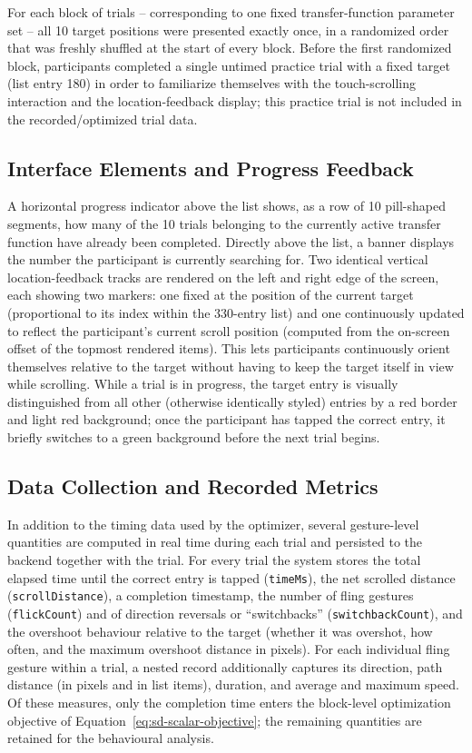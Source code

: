 For each block of trials -- corresponding to one fixed transfer-function parameter set -- all 10 target positions were presented exactly once, in a randomized order that was freshly shuffled at the start of every block. Before the first randomized block, participants completed a single untimed practice trial with a fixed target (list entry 180) in order to familiarize themselves with the touch-scrolling interaction and the location-feedback display; this practice trial is not included in the recorded/optimized trial data.

\subsection{Interface Elements and Progress Feedback}
\label{sec:interface}

A horizontal progress indicator above the list shows, as a row of 10 pill-shaped segments, how many of the 10 trials belonging to the currently active transfer function have already been completed. Directly above the list, a banner displays the number the participant is currently searching for. Two identical vertical location-feedback tracks are rendered on the left and right edge of the screen, each showing two markers: one fixed at the position of the current target (proportional to its index within the 330-entry list) and one continuously updated to reflect the participant's current scroll position (computed from the on-screen offset of the topmost rendered items). This lets participants continuously orient themselves relative to the target without having to keep the target itself in view while scrolling. While a trial is in progress, the target entry is visually distinguished from all other (otherwise identically styled) entries by a red border and light red background; once the participant has tapped the correct entry, it briefly switches to a green background before the next trial begins.

\subsection{Data Collection and Recorded Metrics}
\label{sec:data-collection}

In addition to the timing data used by the optimizer, several gesture-level quantities are computed in real time during each trial and persisted to the backend together with the trial. For every trial the system stores the total elapsed time until the correct entry is tapped (\texttt{timeMs}), the net scrolled distance (\texttt{scrollDistance}), a completion timestamp, the number of fling gestures (\texttt{flickCount}) and of direction reversals or ``switchbacks'' (\texttt{switchbackCount}), and the overshoot behaviour relative to the target (whether it was overshot, how often, and the maximum overshoot distance in pixels). For each individual fling gesture within a trial, a nested record additionally captures its direction, path distance (in pixels and in list items), duration, and average and maximum speed. Of these measures, only the completion time enters the block-level optimization objective of Equation~\eqref{eq:sd-scalar-objective}; the remaining quantities are retained for the behavioural analysis.


